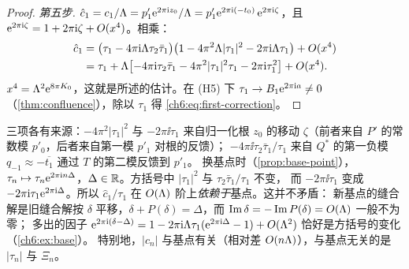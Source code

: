 \begin{proof}
\emph{第五步.} $\hat c_1=c_1/\Lambda=p'_1\mathrm{e}^{2\pi\mathrm{i} z_0}/\Lambda=p'_1\mathrm{e}^{2\pi\mathrm{i} (-t_0)}\,\mathrm{e}^{2\pi\mathrm{i} \zeta}$，且 $\mathrm{e}^{2\pi\mathrm{i} \zeta}=1+2\pi\mathrm{i}\zeta+O(x^4)$。相乘：
\[
 \begin{aligned}
 \hat c_1&=\bigl(\tau_1-4\pi\mathrm{i}\Lambda\tau_2\bar\tau_1\bigr)\bigl(1-4\pi^2\Lambda|\tau_1|^2-2\pi\mathrm{i}\Lambda\tau_1\bigr)+O(x^4)\\
 &=\tau_1+\Lambda\bigl[-4\pi\mathrm{i}\tau_2\bar\tau_1-4\pi^2|\tau_1|^2\tau_1-2\pi\mathrm{i}\tau_1^2\bigr]+O(x^4).
 \end{aligned}
\]
$x^4=\Lambda^2\mathrm{e}^{8\pi K_0}$，这就是所述的估计。在 (H5) 下 $\tau_1\to B_1\mathrm{e}^{2\pi\mathrm{i} a}\ne0$（\cref{thm:confluence}），除以 $\tau_1$ 得 \eqref{ch6:eq:first-correction}。
\end{proof}

\begin{remark}\label{ch6:rem:first-correction}
三项各有来源：$-4\pi^2|\tau_1|^2$ 与 $-2\pi\ii\tau_1$ 来自归一化根 $z_0$ 的移动 $\zeta$（前者来自 $P'$ 的常数模 $p'_0$，后者来自第一模 $p'_1$ 对根的反馈）；
$-4\pi\ii\tau_2\bar\tau_1/\tau_1$ 来自 $Q^*$ 的第一负模 $q_{-1}\approx-\overline{t_1}$ 通过 $T$ 的第二模反馈到 $p'_1$。
换基点时（\cref{prop:base-point}），$\tau_n\mapsto\tau_n\mathrm{e}^{2\pi\mathrm{i} n\Delta}$，$\Delta\in\mathbb{R}$。方括号中 $|\tau_1|^2$ 与 $\tau_2\bar\tau_1/\tau_1$ 不变，
而 $-2\pi\ii\tau_1$ 变成 $-2\pi\mathrm{i}\tau_1\mathrm{e}^{2\pi\mathrm{i} \Delta}$。所以 $\hat c_1/\tau_1$ 在 $O(\Lambda)$ 阶上\emph{依赖于}基点。这并不矛盾：
新基点的缝合解是旧缝合解按 $\delta$ 平移，$\delta+P(\delta)=\Delta$，而 $\operatorname{Im}\delta=-\operatorname{Im} P(\delta)=O(\Lambda)$ 一般不为零；
多出的因子 $\mathrm{e}^{2\pi\mathrm{i} (\delta-\Delta)}=1-2\pi\mathrm{i}\Lambda\tau_1(\mathrm{e}^{2\pi\mathrm{i} \Delta}-1)+O(\Lambda^2)$ 恰好是方括号的变化（\cref{ch6:ex:base}）。
特别地，$|c_n|$ 与基点有关（相对差 $O(n\Lambda)$），与基点无关的是 $|\tau_n|$ 与 $\Xi_n$。
\end{remark}

